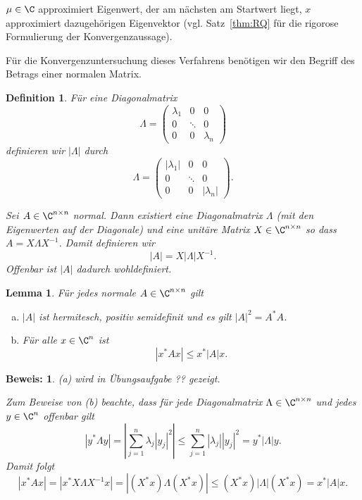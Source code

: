 \documentclass[
]{mycourse}
\theoremstyle{mythm}
\newtheorem{lemma}[theorem]{Lemma}
\newtheorem{definition}[theorem]{Definition}
\theoremstyle{break}
\newtheorem*{beweis}{Beweis:}
\newcommand{\norm}[1]{\left\Vert#1\right\Vert}		%
\begin{document}
\begin{alg}
\label{algo:RQ_Iteration}
\begin{algorithmic}
\Repeat
{}
\State{$x:=\tilde x / \norm{\tilde x}$}
\State \Return $\mu\in \C$ approximiert Eigenwert, der am nächsten am Startwert liegt, $x$ approximiert dazugehörigen
Eigenvektor (vgl. Satz~\ref{thm:RQ} für die rigorose Formulierung der Konvergenzaussage).
\end{algorithmic}
\end{alg}

Für die Konvergenzuntersuchung dieses Verfahrens benötigen wir den Begriff des Betrags einer normalen Matrix.
\begin{definition}
Für eine Diagonalmatrix 
\[
\Lambda=\begin{pmatrix} \lambda_1 & 0 & 0\\ 0 & \ddots & 0\\ 0 & 0 & \lambda_n\end{pmatrix}
\]
definieren wir $|\Lambda|$ durch
\[
\Lambda=\begin{pmatrix} |\lambda_1| & 0 & 0\\ 0 & \ddots & 0\\ 0 & 0 & |\lambda_n| \end{pmatrix}.
\]

Sei $A \in \C^{n\times n}$ normal. Dann existiert eine Diagonalmatrix $\Lambda$ (mit den Eigenwerten auf der Diagonale)
und eine unitäre Matrix $X\in \C^{n\times n}$ so dass $A=X \Lambda X^{-1}$.
Damit definieren wir
\[
|A|=X |\Lambda| X^{-1}.
\]
Offenbar ist $|A|$ dadurch wohldefiniert.
\end{definition}

\begin{lemma}\label{lemma:betrag}
Für jedes normale $A\in \C^{n\times n}$ gilt
\begin{enumerate}[(a)]
\item $|A|$ ist hermitesch, positiv semidefinit und es gilt $|A|^2=A^* A$.
\item Für alle $x\in \C^n$ ist
\[
|x^* A x | \leq x^* |A| x.
\]
\end{enumerate}
\end{lemma}
\begin{beweis}
(a) wird in Übungsaufgabe ?? gezeigt.

Zum Beweise von (b) beachte, dass für jede Diagonalmatrix $\Lambda\in \C^{n\times n}$ und jedes
$y\in \C^n$ offenbar gilt
\[
|y^* \Lambda y|=\left| \sum_{j=1}^n \lambda_j |y_j|^2\right| \leq \sum_{j=1}^n |\lambda_j| |y_j|^2 = y^* |\Lambda| y.
\]
Damit folgt 
\[
|x^* A x | = | x^* X \Lambda X^{-1} x | = | (X^*x) \Lambda (X^* x)| \leq (X^* x) |\Lambda| (X^* x) =  x^* |A| x.
\]
\end{beweis}
\end{document}
